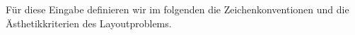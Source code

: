 Für diese Eingabe definieren wir im folgenden die Zeichenkonventionen und die Ästhetikkriterien des Layoutproblems.



